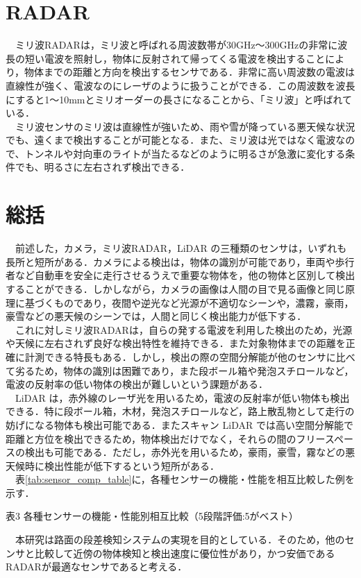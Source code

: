 \section{RADAR}
　ミリ波RADARは，ミリ波と呼ばれる周波数帯が30GHz～300GHzの非常に波長の短い電波を照射し，物体に反射されて帰ってくる電波を検出することにより，物体までの距離と方向を検出するセンサである．非常に高い周波数の電波は直線性が強く、電波なのにレーザのように扱うことができる．この周波数を波長にすると1～10mmとミリオーダーの長さになることから、「ミリ波」と呼ばれている．\\
　ミリ波センサのミリ波は直線性が強いため、雨や雪が降っている悪天候な状況でも、遠くまで検出することが可能となる．また、ミリ波は光ではなく電波なので、トンネルや対向車のライトが当たるなどのように明るさが急激に変化する条件でも、明るさに左右されず検出できる．\cite{zmp_sensor}

\section{総括}
　前述した，カメラ，ミリ波RADAR，LiDAR の三種類のセンサは，いずれも長所と短所がある．カメラによる検出は，物体の識別が可能であり，車両や歩行者など自動車を安全に走行させるうえで重要な物体を，他の物体と区別して検出することができる．しかしながら，カメラの画像は人間の目で見る画像と同じ原理に基づくものであり，夜間や逆光など光源が不適切なシーンや，濃霧，豪雨，豪雪などの悪天候のシーンでは，人間と同じく検出能力が低下する．\\
　これに対しミリ波RADARは，自らの発する電波を利用した検出のため，光源や天候に左右されず良好な検出特性を維持できる．また対象物体までの距離を正確に計測できる特長もある．しかし，検出の際の空間分解能が他のセンサに比べて劣るため，物体の識別は困難であり，また段ボール箱や発泡スチロールなど，電波の反射率の低い物体の検出が難しいという課題がある．\\
　LiDAR は，赤外線のレーザ光を用いるため，電波の反射率が低い物体も検出できる．特に段ボール箱，木材，発泡スチロールなど，路上散乱物として走行の妨げになる物体も検出可能である．またスキャン LiDAR では高い空間分解能で距離と方位を検出できるため，物体検出だけでなく，それらの間のフリースペースの検出も可能である．ただし，赤外光を用いるため，豪雨，豪雪，霧などの悪天候時に検出性能が低下するという短所がある．\\

　表\ref{tab:sensor_comp_table}に，各種センサーの機能・性能を相互比較した例を示す．\cite{cleantechnica_sensor}

\begin{table}[H]
    \centering
    \caption{表3 各種センサーの機能・性能別相互比較（5段階評価:5がベスト）\cite{cleantechnica_sensor}}
    
    \label{tab:sensor_comp_table}
\end{table}

　本研究は路面の段差検知システムの実現を目的としている．そのため，他のセンサと比較して近傍の物体検知と検出速度に優位性があり，かつ安価であるRADARが最適なセンサであると考える．
